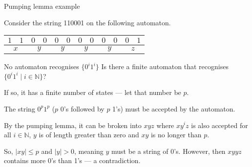 \begin{frame}[fragile]{Pumping lemma example}

    Consider the string 110001 on the following automaton.

    \begin{center}
    \end{center}

    \vspace{2mm}

    \begin{table}
    \begin{tabular}{|cc|cc|cc|cc|cc|cc|}
      \hline
      $1$ & $1$ & $0$ & $0$ & $0$ & $0$ & $0$ & $0$ & $0$ & $0$ & $0$ & $1$ \\
      \hline
      \multicolumn{2}{|c|}{$x$} &
      \multicolumn{2}{c|}{$y$} &
      \multicolumn{2}{c|}{$y$} &
      \multicolumn{2}{c|}{$y$} &
      \multicolumn{2}{c|}{$y$} &
      \multicolumn{2}{c|}{$z$} \\
      \hline
    \end{tabular}
  \end{table}

\end{frame}

\begin{frame}{No automaton recognises $\{ 0^i 1^i \}$}
  \textcolor{gmitblue}{Is there a finite automaton that recognises $\{ 0^i 1^i \mid i \in \mathbb{N} \}$?}
  
  \vspace{4mm}

  If so, it has a finite number of states --- let that number be $p$.

  \vspace{2mm}

  The string $0^p1^p$ ($p$ 0's followed by $p$ 1's) must be accepted by the automaton.

  \vspace{2mm}

  By the pumping lemma, it can be broken into $xyz$ where $xy^iz$ is also accepted for all $i \in \mathbb{N}$, $y$ is of length greater than zero and $xy$ is no longer than $p$.

  \vspace{2mm}

  So, $|xy| \leq p$ and $|y| > 0$, meaning $y$ must be a string of 0's. However, then $xyyz$ contains more 0's than 1's --- a contradiction.

  
\end{frame}